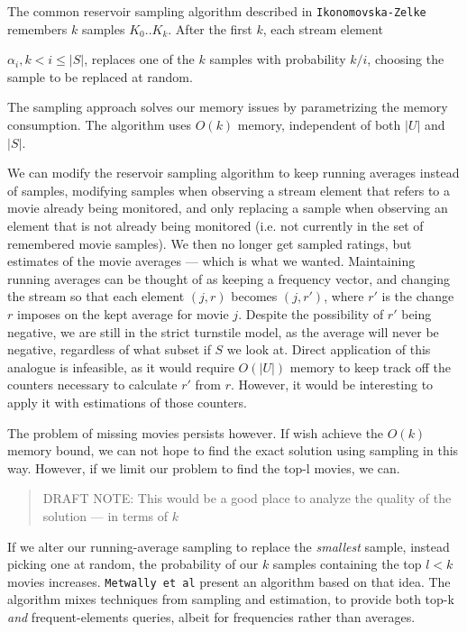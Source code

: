 The common reservoir sampling algorithm described in
\texttt{Ikonomovska\--Zelke} remembers $k$ samples $K_0..K_{k}$. After the first $k$, each
stream element \raggedright{$\alpha_i, k < i \leq |S|$}, replaces one of the
$k$ samples with probability $k/i$, choosing the sample to be replaced at
random.

The sampling approach solves our memory issues by parametrizing the memory
consumption. The algorithm uses $O(k)$ memory, independent of both $|U|$ and
$|S|$.

We can modify the reservoir sampling algorithm to keep running averages instead
of samples, modifying samples when observing a stream element that refers to a
movie already being monitored, and only replacing a sample when observing an
element that is not already being monitored (i.e. not currently in the set of
remembered movie samples). We then no longer get sampled ratings, but estimates
of the movie averages --- which is what we wanted. Maintaining running averages
can be thought of as keeping a frequency vector, and changing the stream so that
each element $(j, r)$ becomes $(j, r')$, where $r'$ is the change $r$ imposes on
the kept average for movie $j$. Despite the possibility of $r'$ being negative,
we are still in the strict turnstile model, as the average will never be
negative, regardless of what subset if $S$ we look at. Direct application of
this analogue is infeasible, as it would require $O(|U|)$ memory to keep
track off the counters necessary to calculate $r'$ from $r$. However, it would
be interesting to apply it with estimations of those counters.

The problem of missing movies persists however. If wish achieve the $O(k)$
memory bound, we can not hope to find the exact solution using sampling in this
way. However, if we limit our problem to find the top-l movies, we can.

\begin{quote}
	DRAFT NOTE: This would be a good place to analyze the quality of the
	solution --- in terms of $k$
\end{quote}

If we alter our running-average sampling to replace the \textit{smallest}
sample, instead picking one at random, the probability of our $k$ samples
containing the top $l<k$ movies increases. \texttt{Metwally et al} present an
algorithm based on that idea. The algorithm mixes techniques from sampling and
estimation, to provide both top-k \textit{and} frequent-elements queries, albeit
for frequencies rather than averages.

